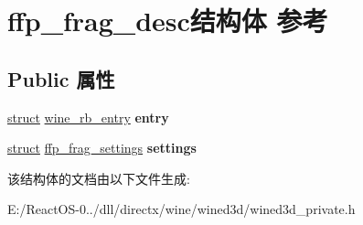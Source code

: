 \hypertarget{structffp__frag__desc}{}\section{ffp\+\_\+frag\+\_\+desc结构体 参考}
\label{structffp__frag__desc}
\subsection*{Public 属性}
\begin{DoxyCompactItemize}
\item 
\mbox{\label{structffp__frag__desc_a1bd5007431e775873b8fbb1dc56814e3}} 
\hyperlink{interfacestruct}{struct} \hyperlink{structwine__rb__entry}{wine\+\_\+rb\+\_\+entry} {\bfseries entry}
\item 
\mbox{\label{structffp__frag__desc_abd2d046ca456e1015544fc107f5f3e7f}} 
\hyperlink{interfacestruct}{struct} \hyperlink{structffp__frag__settings}{ffp\+\_\+frag\+\_\+settings} {\bfseries settings}
\end{DoxyCompactItemize}


该结构体的文档由以下文件生成\+:\begin{DoxyCompactItemize}
\item 
E\+:/\+React\+O\+S-\/0../dll/directx/wine/wined3d/wined3d\+\_\+private.\+h\end{DoxyCompactItemize}
